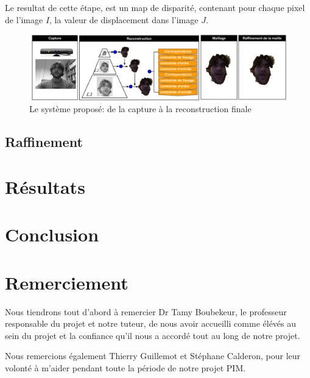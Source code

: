 \documentclass[a4paper,11pt]{article}
\begin{document}
Le resultat de cette étape, est un map de disparité, contenant pour chaque pixel de l'image $I$, la valeur de displacement dans l'image $J$. 

\begin{figure}[h!]
  \begin{center}
    \includegraphics[scale=0.35]{img/projSystem.png}
    \caption{Le système proposé: de la capture à la reconstruction finale}
  \end{center}
\end{figure}


\subsection{Raffinement}

\section{Résultats}

\section{Conclusion}

\section{Remerciement}
Nous tiendrons tout d’abord à remercier Dr Tamy Boubekeur, le professeur responsable du projet et notre tuteur, de nous avoir accueilli comme élévés au sein du projet et la confiance qu’il nous a accordé tout au long de notre projet.

Nous remercions également Thierry Guillemot et Stéphane Calderon, pour leur volonté à m’aider pendant toute la période de notre projet PIM.

\nocite{Beeler:2010:HSC:1778765.1778777}
\nocite{Beeler:2011:HPF:2010324.1964970}

\begin{small}
  
\end{small}
\section*{}
\end{document}
